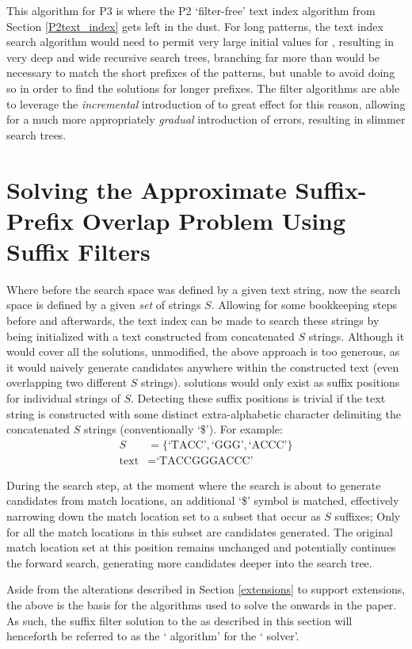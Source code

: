 This algorithm for P3 is where the P2 `filter-free' text index algorithm from Section \ref{P2text_index} gets left in the dust. For long patterns, the text index search algorithm would need to permit very large initial values for , resulting in very deep and wide recursive search trees, branching far more than would be necessary to match the short prefixes of the patterns, but unable to avoid doing so in order to find the solutions for longer prefixes. The filter algorithms are able to leverage the \textit{incremental} introduction of  to great effect for this reason, allowing for a much more appropriately \textit{gradual} introduction of errors, resulting in slimmer search trees.





\section{Solving the Approximate Suffix-Prefix Overlap Problem Using Suffix Filters}
\label{solving_ASPOP}

Where before the search space was defined by a given \gls{text} string, now the search space is defined by a given \textit{set} of strings $S$. Allowing for some bookkeeping steps before and afterwards, the \gls{text index} can be made to search these strings by being initialized with a text constructed from concatenated $S$ strings. Although it would cover all the solutions, unmodified, the above approach is too generous, as it would naively generate \glspl{candidate} anywhere within the constructed text (even overlapping two different $S$ strings). \Glspl{solution} would only exist as suffix positions for individual strings of $S$. Detecting these suffix positions is trivial if the text string is constructed with some distinct extra-alphabetic character delimiting the concatenated $S$ strings (conventionally `\$'). For example:
\begin{align*}
S &= \{\text{`TACC'}, \text{`GGG'}, \text{`ACCC'}\}\\
\text{text} &= \text{`TACCGGGACCC'}
\end{align*}

During the \gls{search step}, at the moment where the search is about to generate candidates from \glspl{match location}, an additional `\$' symbol is matched, effectively narrowing down the match location set to a subset that occur as $S$ suffixes; Only for all the match locations in this subset are candidates generated. The original match location set at this position remains unchanged and potentially continues the forward search, generating more candidates deeper into the search tree.
 
Aside from the alterations described in Section \ref{extensions} to support extensions, the above is the basis for the algorithms used to solve the \aspop{} onwards in the paper. As such, the \gls{suffix filter} solution to the \aspop{} as described in this section will henceforth be referred to as the `\aspop{} algorithm' for the `\aspop{} solver'.


